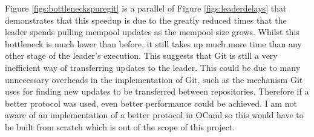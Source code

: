 \documentclass[12pt,a4paper,twoside,openright]{report}
\begin{document}
	Figure \ref{figs:bottleneckspuregit} is a parallel of Figure \ref{figs:leaderdelays} that demonstrates that this speedup is due to the greatly reduced times that the leader spends pulling mempool updates as the mempool size grows.
	Whilst this bottleneck is much lower than before, it still takes up much more time than any other stage of the leader's execution.
	This suggests that Git is still a very inefficient way of transferring updates to the leader.  
	This could be due to many unnecessary overheads in the implementation of Git, such as the mechanism Git uses for finding new updates to be transferred between repositories. 
	Therefore if a better protocol was used, even better performance could be achieved.
	I am not aware of an implementation of a better protocol in OCaml so this would have to be built from scratch which is out of the scope of this project.\\
\end{document}

